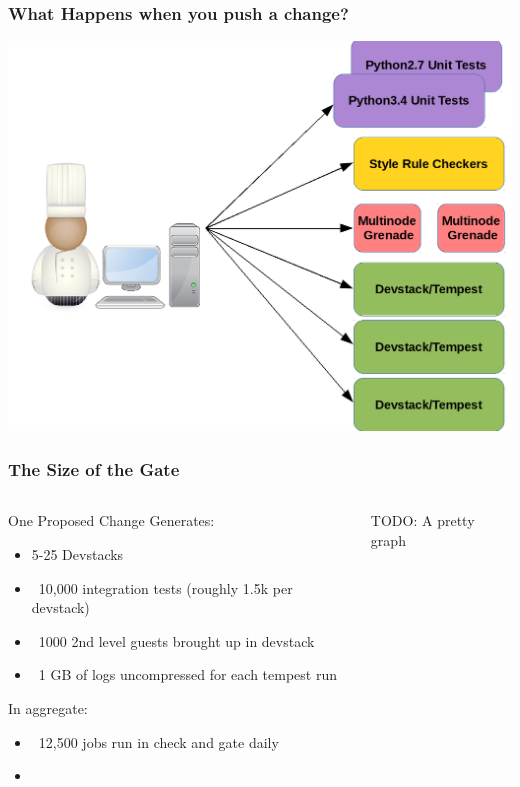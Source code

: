 \documentclass[aspectratio=169,11pt,hyperref={colorlinks=true}]{beamer}
\begin{document}
\begin{frame}
\frametitle{What Happens when you push a change?}
\begin{center}
	\includegraphics[width=.7\textwidth]{jobs.png}
\end{center}
\end{frame}

\begin{frame}
\frametitle{The Size of the Gate}
    \begin{columns}[T]
        \begin{column}{.48\textwidth}
			One Proposed Change Generates:
			\begin{itemize}
				\item 5-25 Devstacks
				\item ~10,000 integration tests (roughly 1.5k per devstack)
				\item ~1000 2nd level guests brought up in devstack
                \item ~1 GB of logs uncompressed for each tempest run
			\end{itemize}
			In aggregate:
            \begin{itemize}
                \item ~12,500 jobs run in check and gate daily
                \item
            \end{itemize}
        \end{column}
        \begin{column}{.48\textwidth}
            TODO: A pretty graph
        \end{column}
    \end{columns}
\end{frame}
\end{document}
